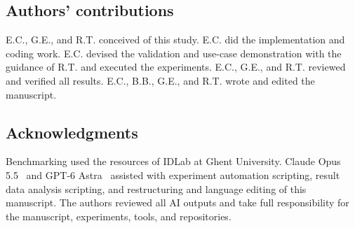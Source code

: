\documentclass[pdflatex,sn-mathphys-num]{sn-jnl}
\begin{document}
\subsection*{Authors' contributions}
E.C., G.E., and R.T. conceived of this study. 
E.C. did the implementation and coding work. 
E.C. devised the validation and use-case demonstration with the guidance of R.T. and executed the experiments. 
E.C., G.E., and R.T. reviewed and verified all results. 
E.C., B.B., G.E., and R.T. wrote and edited the manuscript.

\subsection*{Acknowledgments}
Benchmarking used the resources of IDLab at Ghent University. 
Claude Opus 5.5~\cite{anthropic2026claudeopus55} and GPT-6 Astra~\cite{openai2026gpt6astra} assisted with experiment automation scripting, result data analysis scripting, and restructuring and language editing of this manuscript. The authors reviewed all AI outputs and take full responsibility for the manuscript, experiments, tools, and repositories.

\clearpage

\end{document}
